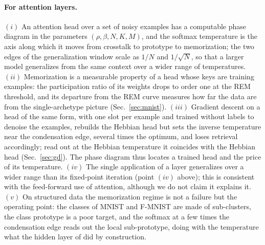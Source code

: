 \documentclass{SciPost}
\theoremstyle{plain}
\theoremstyle{definition}
\begin{document}
\paragraph{For attention layers.} $(i)$ An attention head over a set of noisy examples has a computable phase diagram in the parameters $(\rho,\beta,N,K,M)$, and the softmax temperature is the axis along which it moves from crosstalk to prototype to memorization; the two edges of the generalization window scale as $1/N$ and $1/\sqrt N$, so that a larger model generalizes from the same context over a wider range of temperatures. $(ii)$ Memorization is a measurable property of a head whose keys are training examples: the participation ratio of its weights drops to order one at the REM threshold, and its departure from the REM curve measures how far the data are from the single-archetype picture (Sec.\ \ref{sec:mnist}). $(iii)$ Gradient descent on a head of the same form, with one slot per example and trained without labels to denoise the examples, rebuilds the Hebbian head but sets the inverse temperature near the condensation edge, several times the optimum, and loses retrieval accordingly; read out at the Hebbian temperature it coincides with the Hebbian head (Sec.\ \ref{sec:gd}). The phase diagram thus locates a trained head and the price of its temperature. $(iv)$ The single application of a layer generalizes over a wider range than its fixed-point iteration (point $(iv)$ above); this is consistent with the feed-forward use of attention, although we do not claim it explains it. $(v)$ On structured data the memorization regime is not a failure but the operating point: the classes of MNIST and F-MNIST are made of sub-clusters, the class prototype is a poor target, and the softmax at a few times the condensation edge reads out the local sub-prototype, doing with the temperature what the hidden layer of \cite{Alemanno2023} did by construction.
\end{document}

